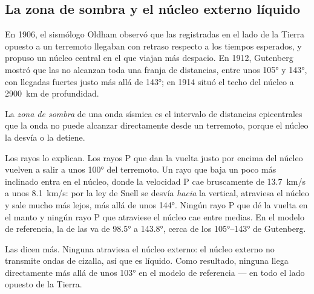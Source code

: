 \subsection{La zona de sombra y el núcleo externo líquido}

En 1906, el sismólogo Oldham observó que las  registradas en el lado
de la Tierra opuesto a un terremoto llegaban con retraso respecto a los
tiempos esperados, y propuso un núcleo central en el que viajan más despacio.
En 1912, Gutenberg mostró que las  no alcanzan toda una franja de
distancias, entre unos \ang{105} y \ang{143}, con llegadas fuertes justo más
allá de \ang{143}; en 1914 situó el techo del núcleo a \qty{2900}{km} de
profundidad.

\begin{definition}\label{def:g11:seismic-structure:shadow-zone}
La \emph{zona de sombra} de una onda sísmica es el
intervalo de distancias epicentrales que la onda no puede alcanzar
directamente desde un terremoto, porque el núcleo la desvía o la detiene.
\end{definition}

Los rayos lo explican. Los rayos P que dan la vuelta justo por encima del
núcleo vuelven a salir a unos \ang{100} del terremoto. Un rayo que baja un
poco más inclinado entra en el núcleo, donde la velocidad P cae bruscamente
de \qty{13.7}{km/s} a unos \qty{8.1}{km/s}: por la ley de Snell se desvía
\emph{hacia} la vertical, atraviesa el núcleo y sale mucho más lejos, más allá
de unos \ang{144}. Ningún rayo P que dé la vuelta en el manto y ningún rayo P
que atraviese el núcleo cae entre medias. En el modelo de referencia, la  de las  va de \ang{98.5} a
\ang{143.8}, cerca de los \ang{105}--\ang{143} de Gutenberg.

Las  dicen más. Ninguna  atraviesa el núcleo externo: el núcleo
externo no transmite ondas de cizalla, así que es líquido. Como resultado,
ninguna  llega directamente más allá de unos \ang{103} en el modelo de
referencia --- en todo el lado opuesto de la Tierra.

